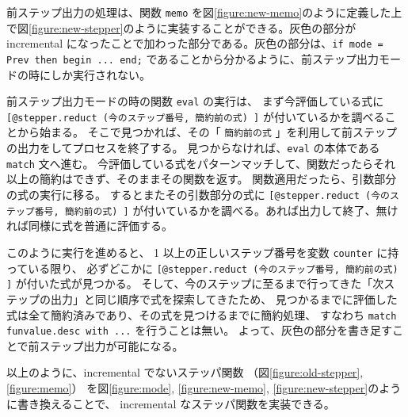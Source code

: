 前ステップ出力の処理は、関数 \texttt{memo} を図\ref{figure:new-memo}のように定義した上で図\ref{figure:new-stepper}のように実装することができる。灰色の部分が incremental になったことで加わった部分である。灰色の部分は、\texttt{if mode = Prev then begin ... end;} であることから分かるように、前ステップ出力モードの時にしか実行されない。

前ステップ出力モードの時の関数 \texttt{eval} の実行は、
まず今評価している式に
\texttt{[@stepper.reduct (今のステップ番号, 簡約前の式) ]}
が付いているかを調べることから始まる。
そこで見つかれば、その「 \texttt{簡約前の式} 」を利用して前ステップの出力をしてプロセスを終了する。
見つからなければ、\texttt{eval} の本体である \texttt{match} 文へ進む。
今評価している式をパターンマッチして、関数だったらそれ以上の簡約はできず、そのままその関数を返す。
関数適用だったら、引数部分の式の実行に移る。
するとまたその引数部分の式に
\texttt{[@stepper.reduct (今のステップ番号, 簡約前の式) ]}
が付いているかを調べる。あれば出力して終了、無ければ同様に式を普通に評価する。

このように実行を進めると、
1 以上の正しいステップ番号を変数 \texttt{counter} に持っている限り、
必ずどこかに \texttt{[@stepper.reduct (今のステップ番号, 簡約前の式) ]} が付いた式が見つかる。
そして、今のステップに至るまで行ってきた「次ステップの出力」と同じ順序で式を探索してきたため、
見つかるまでに評価した式は全て簡約済みであり、その式を見つけるまでに簡約処理、
すなわち \texttt{match fun\US value.desc with ...} を行うことは無い。
よって、灰色の部分を書き足すことで前ステップ出力が可能になる。

以上のように、incremental でないステッパ関数
（図\ref{figure:old-stepper}, \ref{figure:memo}）
を図\ref{figure:mode}, \ref{figure:new-memo}, \ref{figure:new-stepper}のように書き換えることで、
incremental なステッパ関数を実装できる。

